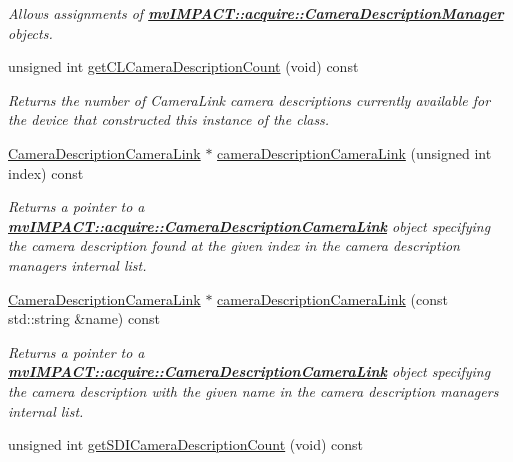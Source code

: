 \begin{DoxyCompactItemize}
\begin{DoxyCompactList}\small\item\em Allows assignments of {\bfseries \hyperlink{classmv_i_m_p_a_c_t_1_1acquire_1_1_camera_description_manager}{mv\+I\+M\+P\+A\+C\+T\+::acquire\+::\+Camera\+Description\+Manager}} objects. \end{DoxyCompactList}\item 
\hypertarget{classmv_i_m_p_a_c_t_1_1acquire_1_1_camera_description_manager_a292ddbfa5b47dad5bcdfa4d18683e375}{unsigned int \hyperlink{classmv_i_m_p_a_c_t_1_1acquire_1_1_camera_description_manager_a292ddbfa5b47dad5bcdfa4d18683e375}{get\+C\+L\+Camera\+Description\+Count} (void) const }\label{classmv_i_m_p_a_c_t_1_1acquire_1_1_camera_description_manager_a292ddbfa5b47dad5bcdfa4d18683e375}

\begin{DoxyCompactList}\small\item\em Returns the number of Camera\+Link\textregistered{} camera descriptions currently available for the device that constructed this instance of the class. \end{DoxyCompactList}\item 
\hyperlink{classmv_i_m_p_a_c_t_1_1acquire_1_1_camera_description_camera_link}{Camera\+Description\+Camera\+Link} $\ast$ \hyperlink{classmv_i_m_p_a_c_t_1_1acquire_1_1_camera_description_manager_ab743ef7d5165d5833ada0379e9fe474e}{camera\+Description\+Camera\+Link} (unsigned int index) const 
\begin{DoxyCompactList}\small\item\em Returns a pointer to a {\bfseries \hyperlink{classmv_i_m_p_a_c_t_1_1acquire_1_1_camera_description_camera_link}{mv\+I\+M\+P\+A\+C\+T\+::acquire\+::\+Camera\+Description\+Camera\+Link}} object specifying the camera description found at the given index in the camera description managers internal list. \end{DoxyCompactList}\item 
\hyperlink{classmv_i_m_p_a_c_t_1_1acquire_1_1_camera_description_camera_link}{Camera\+Description\+Camera\+Link} $\ast$ \hyperlink{classmv_i_m_p_a_c_t_1_1acquire_1_1_camera_description_manager_ab6eae71972102fe4a10b2ccdc9e415bc}{camera\+Description\+Camera\+Link} (const std\+::string \&name) const 
\begin{DoxyCompactList}\small\item\em Returns a pointer to a {\bfseries \hyperlink{classmv_i_m_p_a_c_t_1_1acquire_1_1_camera_description_camera_link}{mv\+I\+M\+P\+A\+C\+T\+::acquire\+::\+Camera\+Description\+Camera\+Link}} object specifying the camera description with the given name in the camera description managers internal list. \end{DoxyCompactList}\item 
\hypertarget{classmv_i_m_p_a_c_t_1_1acquire_1_1_camera_description_manager_ad261ec6605ee115c6e6f6e071ff320ed}{unsigned int \hyperlink{classmv_i_m_p_a_c_t_1_1acquire_1_1_camera_description_manager_ad261ec6605ee115c6e6f6e071ff320ed}{get\+S\+D\+I\+Camera\+Description\+Count} (void) const }\label{classmv_i_m_p_a_c_t_1_1acquire_1_1_camera_description_manager_ad261ec6605ee115c6e6f6e071ff320ed}


\end{DoxyCompactItemize}
